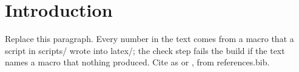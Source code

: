 \section{Introduction}

Replace this paragraph. Every number in the text comes from a macro that a script in scripts/ wrote into latex/;
the check step fails the build if the text names a macro that nothing produced. Cite as
\citet{example2026} or \citep{example2026}, from references.bib.
